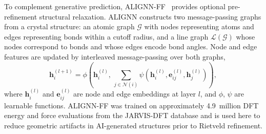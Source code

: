 \documentclass[pdflatex,sn-mathphys-num]{sn-jnl}
\theoremstyle{thmstyleone}
\theoremstyle{thmstyletwo}
\theoremstyle{thmstylethree}
\begin{document}
  To complement generative prediction, ALIGNN-FF~\cite{choudhary2023unified}                                                                                                      
  provides optional pre-refinement structural relaxation. ALIGNN constructs two
  message-passing graphs from a crystal structure: an atomic graph $\mathcal{G}$                                                                                                  
  with nodes representing atoms and edges representing bonds within a cutoff                                                                                                      
  radius, and a line graph $\mathcal{L}(\mathcal{G})$ whose nodes correspond to                                                                                                   
  bonds and whose edges encode bond angles. Node and edge features are updated by                                                                                                 
  interleaved message-passing over both graphs,                                                                                                                                   
  \begin{equation}                                                                                                                                                                
    \mathbf{h}_i^{(l+1)} = \phi\!\left(\mathbf{h}_i^{(l)},\,                                                                                                                      
      \sum_{j \in \mathcal{N}(i)} \psi\!\left(\mathbf{h}_i^{(l)},                                                                                                                 
        \mathbf{e}_{ij}^{(l)}, \mathbf{h}_j^{(l)}\right)\right),                                                                                                                  
  \end{equation}                                                                                                                                                                  
  where $\mathbf{h}_i^{(l)}$ and $\mathbf{e}_{ij}^{(l)}$ are node and edge                                                                                                        
  embeddings at layer $l$, and $\phi$, $\psi$ are learnable functions. ALIGNN-FF                                                                                                  
  was trained on approximately 4.9~million DFT energy and force evaluations from                                                                                                  
  the JARVIS-DFT database and is used here to reduce geometric artifacts in                                                                                                       
  AI-generated structures prior to Rietveld refinement.                                                                                                                           
                                                                                                                                                                                  
\end{document}
